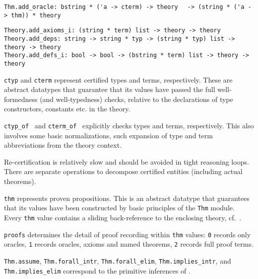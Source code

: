 \begin{isabellebody}
\begin{isamarkuptext}
\begin{mldecls}
  \verb|Thm.add_oracle: bstring * ('a -> cterm) -> theory|\isasep\isanewline%
\verb|  -> (string * ('a -> thm)) * theory| \\
  \end{mldecls}
  \begin{mldecls}
  \verb|Theory.add_axioms_i: (string * term) list -> theory -> theory| \\
  \verb|Theory.add_deps: string -> string * typ -> (string * typ) list -> theory -> theory| \\
  \verb|Theory.add_defs_i: bool -> bool -> (bstring * term) list -> theory -> theory| \\
  \end{mldecls}

  \begin{description}

  \item \verb|ctyp| and \verb|cterm| represent certified types
  and terms, respectively.  These are abstract datatypes that
  guarantee that its values have passed the full well-formedness (and
  well-typedness) checks, relative to the declarations of type
  constructors, constants etc. in the theory.

  \item \verb|ctyp_of|~ and \verb|cterm_of|~ explicitly checks types and terms, respectively.  This also
  involves some basic normalizations, such expansion of type and term
  abbreviations from the theory context.

  Re-certification is relatively slow and should be avoided in tight
  reasoning loops.  There are separate operations to decompose
  certified entities (including actual theorems).

  \item \verb|thm| represents proven propositions.  This is an
  abstract datatype that guarantees that its values have been
  constructed by basic principles of the \verb|Thm| module.
  Every \verb|thm| value contains a sliding back-reference to the
  enclosing theory, cf.\ .

  \item \verb|proofs| determines the detail of proof recording within
  \verb|thm| values: \verb|0| records only oracles, \verb|1| records
  oracles, axioms and named theorems, \verb|2| records full proof
  terms.

  \item \verb|Thm.assume|, \verb|Thm.forall_intr|, \verb|Thm.forall_elim|, \verb|Thm.implies_intr|, and \verb|Thm.implies_elim|
  correspond to the primitive inferences of .


\end{description}
\end{isamarkuptext}
\end{isabellebody}

